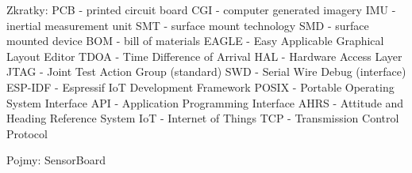 Zkratky:
PCB - printed circuit board
CGI - computer generated imagery
IMU - inertial measurement unit
SMT - surface mount technology
SMD - surface mounted device
BOM - bill of materials
EAGLE - Easy Applicable Graphical Layout Editor
TDOA - Time Difference of Arrival
HAL - Hardware Access Layer
JTAG - Joint Test Action Group (standard)
SWD - Serial Wire Debug (interface)
ESP-IDF - Espressif IoT Development Framework
POSIX - Portable Operating System Interface
API - Application Programming Interface
AHRS - Attitude and Heading Reference System
IoT - Internet of Things
TCP - Transmission Control Protocol

Pojmy:
SensorBoard